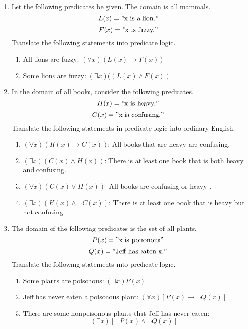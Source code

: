 \documentclass[12pt]{article}
\begin{document}
\begin{enumerate}
      \item Let the following predicates be given. The domain is all mammals.
            \[L(x) = "\text{x is a lion.}"\]
            \[F(x) = "\text{x is fuzzy.}"\]
            Translate the following statements into predicate logic.
            \begin{enumerate}
                  \item All lions are fuzzy: $(\forall x)(L(x) \rightarrow F(x))$
                  \item Some lions are fuzzy: $(\exists x)((L(x) \wedge F(x))$
            \end{enumerate}

      \item In the domain of all books, consider the following predicates.
            \[H(x) = "\text{x is heavy.}"\]
            \[C(x) = "\text{x is confusing.}"\]
            Translate the following statements in predicate logic into ordinary English.
            \begin{enumerate}
                  \item $(\forall x)(H(x) \rightarrow C(x))$: All books that are heavy are confusing.
                  \item $(\exists x)(C(x) \wedge H(x))$: There is at least one book that is both heavy and confusing.
                  \item $(\forall x)(C(x) \vee H(x))$: All books are confusing or heavy   .
                  \item $(\exists x)(H(x) \wedge \neg C(x))$: There is at least one book that is heavy but not confusing.
            \end{enumerate}

      \item The domain of the following predicates is the set of all plants.
            \[P(x) = "\text{x is poisonous}"\]
            \[Q(x) = "\text{Jeff has eaten x.}"\]
            Translate the following statements into predicate logic.
            \begin{enumerate}
                  \item Some plants are poisonous: $(\exists x)P(x)$
                  \item Jeff has never eaten a poisonous plant: $(\forall x)[P(x) \rightarrow \neg Q(x)]$
                  \item There are some nonpoisonous plants that Jeff has never eaten: \[(\exists x) [\neg P(x) \wedge \neg Q(x)] \]
            \end{enumerate}


\end{enumerate}
\end{document}
